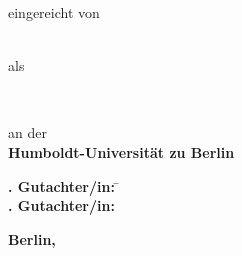 \makeatletter
\begin{titlepage}
\doublespacing\centering%
\vspace*{-24.5mm}\noindent\makebox[\textwidth]{\phantom{Vadid Gissnkra}\hspace*{-19mm}}

\textbf{\Huge\sffamily \@title}\vskip 2.5mm

\textbf{\Large\sffamily \@subtitle}\vfill

{\large eingereicht von}\\
\resizebox{%
      \ifdim\width>\textwidth
        \textwidth
      \else
        \width
      \fi
    }{!}{%
    \textbf{\Large\sffamily \@author}}\\\vfill%

{\large als}\\
    \textbf{\Large\sffamily\degreevar}\vfill

{\large\degreecontextvar}\\
\resizebox{%
      \ifdim\width>\textwidth
        \textwidth
      \else
        \width
      \fi
    }{!}{%
    \textbf{\Large\sffamily\programmevar}}\vfill

{\large an der}\\
\textbf{\Large\sffamily Humboldt-Universität zu Berlin}\vfill

\resizebox{%
      \ifdim\width>\textwidth
        \textwidth
      \else
        \width
      \fi
    }{!}{%
    \textbf{\Large\sffamily\facultyvar}}

\resizebox{%
      \ifdim\width>\textwidth
        \textwidth
      \else
        \width
      \fi
    }{!}{%
    \textbf{\Large\sffamily\institutevar}}\vfill

\parbox{0cm}{\large%
    \begin{tabbing}
        \textbf{. Gutachter/in:} \= \firstsupervisorvar\\
        \textbf{. Gutachter/in:} \> \secondsupervisorvar
    \end{tabbing}
}\vfill


\enlargethispage{16mm}\textbf{\large\sffamily Berlin, \@date}
\end{titlepage}
\makeatother
\thispagestyle{empty}
\hbox{}\vfill\enlargethispage{15mm}
